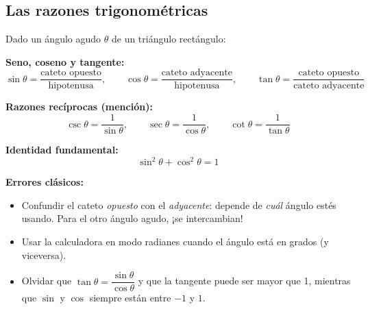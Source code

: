\documentclass[12pt, letterpaper]{article}
\providecommand{\sen}{\sin}
\begin{document}
\newpage

\subsection{Las razones trigonométricas}

\begin{cuadroteoria}
  Dado un ángulo agudo $\theta$ de un triángulo rectángulo:
  \begin{center}
  \end{center}
  \textbf{Seno, coseno y tangente:}
  $$\sen \theta = \frac{\text{cateto opuesto}}{\text{hipotenusa}}, \qquad
    \cos \theta = \frac{\text{cateto adyacente}}{\text{hipotenusa}}, \qquad
    \tan \theta = \frac{\text{cateto opuesto}}{\text{cateto adyacente}}$$

  \textbf{Razones recíprocas (mención):}
  $$\csc \theta = \frac{1}{\sen \theta}, \qquad
    \sec \theta = \frac{1}{\cos \theta}, \qquad
    \cot \theta = \frac{1}{\tan \theta}$$

  \textbf{Identidad fundamental:}
  $$\sen^2 \theta + \cos^2 \theta = 1$$
\end{cuadroteoria}

\begin{cuadroadvertencia}
  \textbf{Errores clásicos:}
  \begin{itemize}[leftmargin=*]
    \item Confundir el cateto \emph{opuesto} con el \emph{adyacente}: depende de \emph{cuál} ángulo estés usando. Para el otro ángulo agudo, ¡se intercambian!
    \item Usar la calculadora en modo radianes cuando el ángulo está en grados (y viceversa).
    \item Olvidar que $\tan \theta = \dfrac{\sen \theta}{\cos \theta}$ y que la tangente puede ser mayor que 1, mientras que $\sen$ y $\cos$ siempre están entre $-1$ y $1$.
  \end{itemize}
\end{cuadroadvertencia}
\end{document}
